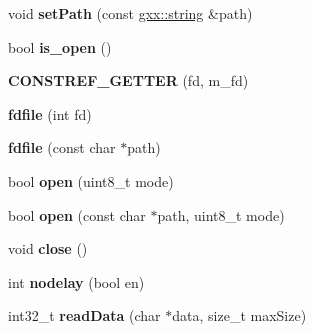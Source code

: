 \begin{DoxyCompactItemize}
\item 
void {\bfseries set\+Path} (const \hyperlink{classgxx_1_1basic__string}{gxx\+::string} \&path)\hypertarget{classgxx_1_1io_1_1fdfile_a7d855019c768ee5d4f656d9289bf49ab}{}\label{classgxx_1_1io_1_1fdfile_a7d855019c768ee5d4f656d9289bf49ab}

\item 
bool {\bfseries is\+\_\+open} ()\hypertarget{classgxx_1_1io_1_1fdfile_afc7c22aef521c4466e4c6d19a40afd5e}{}\label{classgxx_1_1io_1_1fdfile_afc7c22aef521c4466e4c6d19a40afd5e}

\item 
{\bfseries C\+O\+N\+S\+T\+R\+E\+F\+\_\+\+G\+E\+T\+T\+ER} (fd, m\+\_\+fd)\hypertarget{classgxx_1_1io_1_1fdfile_acdee1a0d8c4f6ea45734ec8a421da42d}{}\label{classgxx_1_1io_1_1fdfile_acdee1a0d8c4f6ea45734ec8a421da42d}

\item 
{\bfseries fdfile} (int fd)\hypertarget{classgxx_1_1io_1_1fdfile_acd19f40ea5bddf489b5ba31e7e7e92b6}{}\label{classgxx_1_1io_1_1fdfile_acd19f40ea5bddf489b5ba31e7e7e92b6}

\item 
{\bfseries fdfile} (const char $\ast$path)\hypertarget{classgxx_1_1io_1_1fdfile_a91ed2c96d8b0f11743c757382c03856d}{}\label{classgxx_1_1io_1_1fdfile_a91ed2c96d8b0f11743c757382c03856d}

\item 
bool {\bfseries open} (uint8\+\_\+t mode)\hypertarget{classgxx_1_1io_1_1fdfile_a4136ebc1a0cb06959d77a3a208370499}{}\label{classgxx_1_1io_1_1fdfile_a4136ebc1a0cb06959d77a3a208370499}

\item 
bool {\bfseries open} (const char $\ast$path, uint8\+\_\+t mode)\hypertarget{classgxx_1_1io_1_1fdfile_a4385f6258e930936490b1783409e7064}{}\label{classgxx_1_1io_1_1fdfile_a4385f6258e930936490b1783409e7064}

\item 
void {\bfseries close} ()\hypertarget{classgxx_1_1io_1_1fdfile_a17938c189c1daf14bb540043ee0bb949}{}\label{classgxx_1_1io_1_1fdfile_a17938c189c1daf14bb540043ee0bb949}

\item 
int {\bfseries nodelay} (bool en)\hypertarget{classgxx_1_1io_1_1fdfile_af1f04e5ea0f802ed249e7e70f22e640a}{}\label{classgxx_1_1io_1_1fdfile_af1f04e5ea0f802ed249e7e70f22e640a}

\item 
int32\+\_\+t {\bfseries read\+Data} (char $\ast$data, size\+\_\+t max\+Size)\hypertarget{classgxx_1_1io_1_1fdfile_aab55e428338784966263ce9311c752ea}{}\label{classgxx_1_1io_1_1fdfile_aab55e428338784966263ce9311c752ea}


\end{DoxyCompactItemize}

